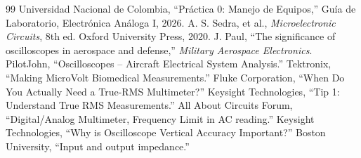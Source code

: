 \documentclass[journal, a4paper]{IEEEtran}
\begin{document}
\renewcommand{\refname}{Referencias}
\begin{thebibliography}{99}
 Universidad Nacional de Colombia, ``Práctica 0: Manejo de Equipos,'' Guía de Laboratorio, Electrónica Análoga I, 2026.
 A. S. Sedra, et al., \textit{Microelectronic Circuits}, 8th ed. Oxford University Press, 2020.
 J. Paul, ``The significance of oscilloscopes in aerospace and defense,'' \textit{Military Aerospace Electronics}.
 PilotJohn, ``Oscilloscopes -- Aircraft Electrical System Analysis.''
 Tektronix, ``Making MicroVolt Biomedical Measurements.''
 Fluke Corporation, ``When Do You Actually Need a True-RMS Multimeter?''
 Keysight Technologies, ``Tip 1: Understand True RMS Measurements.''
 All About Circuits Forum, ``Digital/Analog Multimeter, Frequency Limit in AC reading.''
 Keysight Technologies, ``Why is Oscilloscope Vertical Accuracy Important?''
 Boston University, ``Input and output impedance.''
\end{thebibliography}
\end{document}
